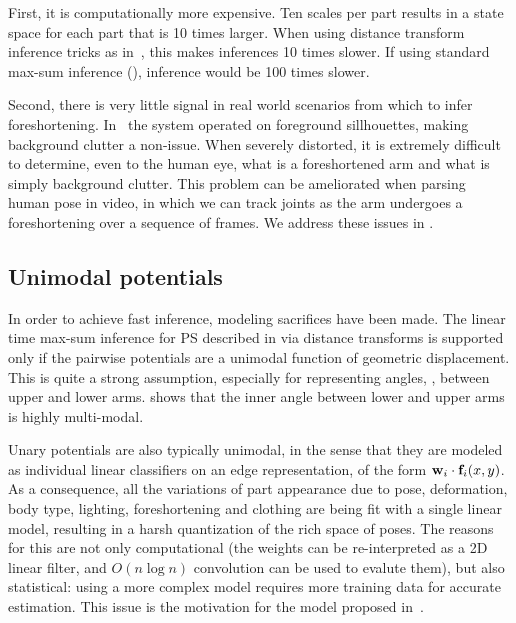  First, it is computationally more expensive.  Ten scales per part results in a 
state space for each part that is 10 times larger.  When using distance 
transform inference tricks as in~, this makes inferences 10 times 
slower.  If using standard max-sum inference (), inference 
would be 100 times slower.   

Second, there is very little signal in real world scenarios from which to infer 
foreshortening.  In~\citet{felz05} the system operated on foreground 
sillhouettes, making background clutter a non-issue.  When severely distorted, 
it is extremely difficult to determine, even to the human eye, what is a 
foreshortened arm and what is simply background clutter. This problem can be 
ameliorated when parsing human pose in video, in which we can track joints as 
the arm undergoes a foreshortening over a sequence of frames.  We address these 
issues in .

\subsection{Unimodal potentials}

In order to achieve fast inference, modeling sacrifices have been made.  The 
linear time max-sum inference for PS described in  via distance 
transforms is supported only if the pairwise potentials are a unimodal function 
of geometric displacement.  This is quite a strong assumption, especially for 
representing angles, \eg, between upper and lower arms.  
 shows that the inner angle between lower and 
upper arms is highly multi-modal.

Unary potentials are also typically unimodal, in the sense that they are 
modeled as individual linear classifiers on an edge representation, of the form 
$\mathbf{w}_i \cdot \mathbf{f}_i(x,y)$.  As a consequence, all the variations of part 
appearance due to pose, deformation, body type, lighting, foreshortening and 
clothing are being fit with a single linear model, resulting in a harsh 
quantization of the rich space of poses.  The reasons for this are not only 
computational (the weights can be re-interpreted as a 2D linear filter, and 
$O(n \log n)$ convolution can be used to evalute them), but also statistical: 
using a more complex model requires more training data for accurate estimation.  
This issue is the motivation for the model proposed in~.

